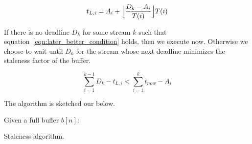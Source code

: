 \begin{equation}
t_{L,i} = A_{i} + \Bigl\lfloor \frac{D_{k}-A_{i}}{T(i)} \Bigr\rfloor T(i)
\label{eqn:last_deadline}
\end{equation}

If there is no deadline $D_{k}$ for some stream $k$ such that equation~\ref{eqn:later_better_condition} holds, then we execute now.  Otherwise we choose to wait
until $D_{k}$ for the stream whose next deadline minimizes the staleness factor of the buffer.


\begin{equation}
\sum_{i=1}^{k-1} D_{k} - t_{L,i} < \sum_{i=1}^{k} t_{now} - A_{i}
\label{eqn:later_better_condition}
\end{equation}

The algorithm is sketched our below.


\begin{algorithm}[h!]
 \SetAlgoLined
 Given a full buffer $b[n]$:\\
 \caption{Staleness algorithm.}
 \label{alg:emd}
\end{algorithm}

